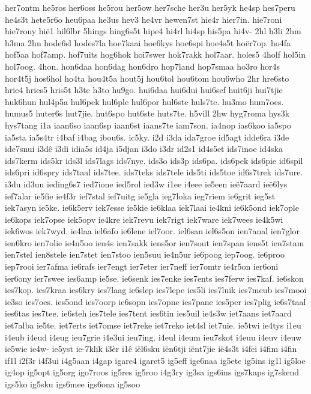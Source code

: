 {her7ontm
he5ros
her6oss
he5rou
her5ow
her7sche
her3u
her5yk
he4sp
hes7peru
he4s3t
hete5r6o
heu6paa
he3us
hev3
he4vr
hewen7st
hie4r
hier7in.
hie7roni
hie7rony
hië1
hil6lbr
5hings
hing6s5t
hipe4
hi4rl
hi4sp
his5pa
hi4v-
2hl
h3li
2hm
h3ma
2hn
hode6sl
hodes7la
hoe7kaai
hoe6kys
hoe6spi
hoe4s5t
hoër7op.
ho4fa
hof5aa
hof7amp.
hof7uits
hog6hok
hoi7swer
hok7rakk
hol7aar.
holes5
4holf
hol5in
hol7oog.
4hon.
hon6daa
hon6dag
hon6dro
hop7land
hop7smaa
ho3ro
hor4s
hor4t5j
hos6hol
ho4ta
hou4t5a
hout5j
hou6tol
hou6tom
hou6who
2hr
hre6sto
hrie4
hries5
hris5t
h3te
h3to
hu9go.
hui6daa
hui6dui
hui6sef
huit6ji
hui7tjie
huk6hun
hul4p5a
hul6pek
hul6ple
hul6por
hul6ste
huls7te.
hu3mo
hum7oes.
humus5
huter6s
hut7jie.
hut6spo
hut6ste
huts7te.
h5vill
2hw
hyg7roma
hys3k
hys7tang
i1a
iaan6so
iaan6sp
iaan6st
iaans7te
iam7son.
ia4nop
ias6koo
ia5spo
ia5sta
ia5s4tr
i4baf
i4bag
ibou6s.
ic5ky.
i2d
i3da
ida7groe
id5agt
idde6ra
i3de
ide7snui
i3dê
i3di
idia5s
id4ja
i5djan
i3do
i3dr
id2s1
id4s5et
ids7inoe
id4ska
ids7kerm
ids5kr
ids3l
ids7lags
ids7nye.
ids3o
ids3p
ids6pa.
ids6pek
ids6pie
id6spil
ids6pri
id6spry
ids7taal
ids7tee.
ids7teks
ids7tele
ids5ti
ids5toe
id6s7trek
ids7ure.
i3du
id3uu
ieding6s7
ied7ione
ied5rol
ied3w
i1ee
i4eee
ie5een
ieë7aard
ieë6lys
ief7alar
ie5fie
ie4f3r
ief7stal
ief7uitg
ie5gla
ieg7loka
ieg7riem
ie6grit
ieg5st
iek7asyn
ie5ke.
ie6k5erv
iek7esse
ie5kie
ie6klaa
iek7laai
ie4kni
ie6k5ond
iek7ople
ie6kops
iek7opse
iek5opv
ie4kre
iek7revu
iek7rigt
iek7ware
iek7wees
ie4k5wi
iek6wos
iek7wyd.
ie4laa
iel6afo
ie6lene
iel7oor.
iel6san
iel6s5on
ien7anal
ien7glor
ien6kro
ien7olie
ie4n5oo
ien4s
ien7sakk
iens5or
ien7sout
ien7span
iens5t
ien7stam
ien7stel
ien8stele
ien7stet
ien7stoo
ien5suu
ie4n5ur
ie6poog
iep7oog.
ie6proo
iep7rooi
ier7afma
ie6rafs
ier7engt
ier7eter
ier7neff
ier7omtr
ie4r5on
ier6oni
ier6ony
ier7swee
ies6amp
ie5se.
ie6senk
ies7enke
ies7ents
ies7ferw
ies7kaf.
ie6skon
ies7kop.
ies7kraa
ies6kry
ies7laag
ie6slep
ies7lepe
ies5li
ies7luik
ies7meub
ies7mooi
ie3so
ies7oes.
ies5ond
ies7oorp
ie6sopn
ies7opne
ies7pane
ies5per
ies7plig
ie6s7taal
ies6tas
ies7tee.
ie6steh
ies7tele
ies7tent
ies6tin
ies5uil
ie4s3w
iet7aans
iet7aard
iet7alba
ie5te.
iet7erts
iet7omse
iet7reke
iet7reko
iet4sl
iet7uie.
ie5twi
ie4tys
i1eu
i4eub
i4eud
i4eug
ieu7grie
i4e3ui
ieu7ing.
i4eul
i4eum
ieu7skot
i4euu
i4euv
i4euw
ie5wie
ie4w-
ie5yst
ie-7klik
i3èr
i1ê
iël6sku
iën6tji
iënt7jie
ië4s3t
i4fei
i4fim
i4fin
if1l
i2f3r
i4f3ui
i4g5aan
i4gap
igare4
igaret5
ig5eff
ige6naa
ig5ete
ig5ins
ig1l
ig5loe
ig4op
ig5opt
ig5org
igo7roos
ig5res
ig5roo
i4g3ry
ig3sa
igs6ins
igs7kaps
ig7skend
igs5ko
ig5sku
igs6mee
igs6ona
ig5soo
}
